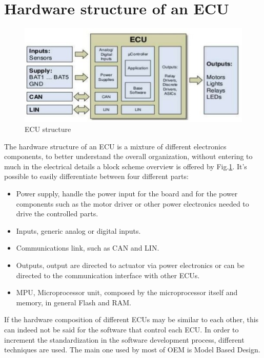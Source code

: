\documentclass[../main.tex]{subfiles}
\begin{document}
\section{Hardware structure of an ECU}
\begin{figure}[h]
    \centering
    \includegraphics[width=\linewidth]{images_folder/electronic-control-unitecu-6-638.jpg}
    \caption{ECU structure}
    \label{fig:ECUHW}
\end{figure}
The hardware structure of an \gls{ECU} is a mixture of different electronics components, to better understand the overall organization, without entering to much in the electrical details a block scheme overview is offered by Fig.\ref{fig:ECUHW}. It's possible to easily differentiate between four different parts:
\begin{itemize}
    \item Power supply, handle the power input for the board and for the power components such as the motor driver or other power electronics needed to drive the controlled parts. 
    \item Inputs, generic analog or digital inputs.
    \item Communications link, such as \gls{CAN} and \gls{LIN}.
    \item Outputs, output are directed to actuator via power electronics or can be directed to the communication interface with other \gls{ECU}s.
    \item \gls{MPU}, Microprocessor unit, composed by the microprocessor itself and memory, in general Flash and \gls{RAM}. 
\end{itemize}
If the hardware composition of different \gls{ECU}s may be similar to each other, this can indeed not be said for the software that control each \gls{ECU}. In order to increment the standardization in the software development process, different techniques are used. The main one used by most of \gls{OEM} is Model Based Design. 
\end{document}
